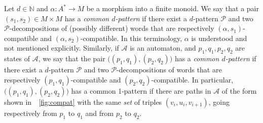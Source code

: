 \documentclass{LMCS}
\newcommand\nat{\ensuremath{\mathbb{N}}\xspace}
\newcommand\As{\ensuremath{\mathcal{A}}\xspace}
\newcommand\Ps{\ensuremath{\mathcal{P}}\xspace}
\newcommand\decops[1]{\ensuremath{#1}-decompositions\xspace}
\newcommand\pfsdecomps{\decops{\Ps}}
\theoremstyle{plain}
\begin{document}
\medskip{} Let $d \in \nat$ and $\alpha:A^*\to
M$ be a morphism into a finite monoid. We say that a pair $(s_1,s_2)\in
M\times M$ has a \emph{common $d$-pattern} if there exist a $d$-pattern \Ps
and two \pfsdecomps of (possibly different) words that are respectively
$(\alpha,s_1)$-compatible and $(\alpha,s_2)$-compatible. In this
terminology, $\alpha$ is understood and not mentioned
explicitly. Similarly, if $\As$ is an automaton, and $p_1,q_1,p_2,q_2$ are states of $\As$, we say that the
pair $\bigl((p_1,q_1),(p_2,q_2)\bigr)$ has a \emph{common $d$-pattern} if
there exist a $d$-pattern \Ps and two \pfsdecomps of words that are
respectively $(p_1,q_1)$-compatible and $(p_2,q_2)$-compatible.  In
particular, $\bigl((p_1,q_1),(p_2,q_2)\bigr)$ has a common 1-pattern if there
are paths in $\As$ of the form shown in~\figurename~\ref{fig:compat}
with the same \emph{set} of triples $(v_i,u_i,v_{i+1})$, going respectively
from $p_1$ to $q_1$ and from $p_2$ to $q_2$.

\smallskip
\end{document}
